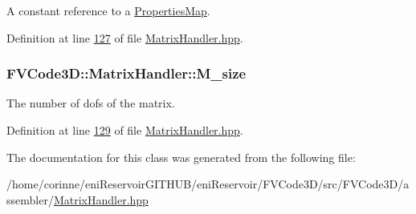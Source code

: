 A constant reference to a \hyperlink{classFVCode3D_1_1PropertiesMap}{Properties\+Map}. 



Definition at line \hyperlink{MatrixHandler_8hpp_source_l00127}{127} of file \hyperlink{MatrixHandler_8hpp_source}{Matrix\+Handler.\+hpp}.

\subsubsection[{\texorpdfstring{M\+\_\+size}{M_size}}]{ F\+V\+Code3\+D\+::\+Matrix\+Handler\+::\+M\+\_\+size\hspace{0.3cm}{\ttfamily [protected]}}\hypertarget{classFVCode3D_1_1MatrixHandler_a0162a412f52cf9a540ea359e6a5c9a6f}{}\label{classFVCode3D_1_1MatrixHandler_a0162a412f52cf9a540ea359e6a5c9a6f}


The number of dofs of the matrix. 



Definition at line \hyperlink{MatrixHandler_8hpp_source_l00129}{129} of file \hyperlink{MatrixHandler_8hpp_source}{Matrix\+Handler.\+hpp}.



The documentation for this class was generated from the following file\+:\begin{DoxyCompactItemize}
\item 
/home/corinne/eni\+Reservoir\+G\+I\+T\+H\+U\+B/eni\+Reservoir/\+F\+V\+Code3\+D/src/\+F\+V\+Code3\+D/assembler/\hyperlink{MatrixHandler_8hpp}{Matrix\+Handler.\+hpp}\end{DoxyCompactItemize}
